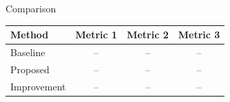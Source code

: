\begin{frame}{Comparison}

\begin{center}
\small
\begin{tabular}{>{\RaggedRight\arraybackslash}p{} ccc}
\toprule
\textbf{Method} & \textbf{Metric 1} & \textbf{Metric 2} & \textbf{Metric 3} \\
\midrule
Baseline & -- & -- & -- \\
Proposed & -- & -- & -- \\
Improvement & -- & -- & -- \\
\bottomrule
\end{tabular}
\end{center}

\vspace{0.35cm}


\end{frame}
